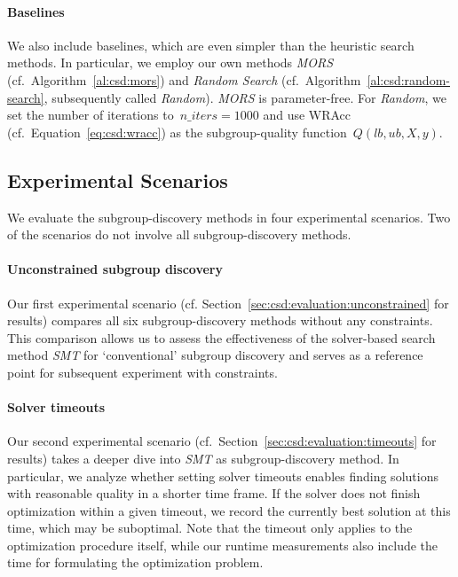 \documentclass{article}
\theoremstyle{definition}
\begin{document}
\paragraph{Baselines}

We also include baselines, which are even simpler than the heuristic search methods.
In particular, we employ our own methods \emph{MORS} (cf.~Algorithm~\ref{al:csd:mors}) and \emph{Random Search} (cf.~Algorithm~\ref{al:csd:random-search}, subsequently called \emph{Random}).
\emph{MORS} is parameter-free.
For \emph{Random}, we set the number of iterations to~$\mathit{n\_iters} = 1000$ and use WRAcc (cf.~Equation~\ref{eq:csd:wracc}) as the subgroup-quality function~$Q(\mathit{lb}, \mathit{ub}, X, y)$.

\subsection{Experimental Scenarios}
\label{sec:csd:experimental-design:scenarios}

We evaluate the subgroup-discovery methods in four experimental scenarios.
Two of the scenarios do not involve all subgroup-discovery methods.

\paragraph{Unconstrained subgroup discovery}

Our first experimental scenario (cf. Section~\ref{sec:csd:evaluation:unconstrained} for results) compares all six subgroup-discovery methods without any constraints.
This comparison allows us to assess the effectiveness of the solver-based search method \emph{SMT} for `conventional' subgroup discovery and serves as a reference point for subsequent experiment with constraints.

\paragraph{Solver timeouts}

Our second experimental scenario (cf.~Section~\ref{sec:csd:evaluation:timeouts} for results) takes a deeper dive into \emph{SMT} as subgroup-discovery method.
In particular, we analyze whether setting solver timeouts enables finding solutions with reasonable quality in a shorter time frame.
If the solver does not finish optimization within a given timeout, we record the currently best solution at this time, which may be suboptimal.
Note that the timeout only applies to the optimization procedure itself, while our runtime measurements also include the time for formulating the optimization problem.
\end{document}

